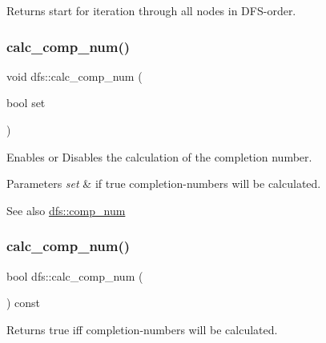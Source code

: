 \begin{DoxyReturn}{Returns}
start for iteration through all nodes in D\+F\+S-\/order. 
\end{DoxyReturn}
\mbox{\label{classdfs_a70862ea715c52eb95fb704afd3a6e676}} 
\subsubsection{\texorpdfstring{calc\+\_\+comp\+\_\+num()}{calc\_comp\_num()}\hspace{0.1cm}{\footnotesize\ttfamily [1/2]}}
{\footnotesize\ttfamily void dfs\+::calc\+\_\+comp\+\_\+num (\begin{DoxyParamCaption}\item[{bool}]{set }\end{DoxyParamCaption})}



Enables or Disables the calculation of the completion number. 


\begin{DoxyParams}{Parameters}
{\em set} & if true completion-\/numbers will be calculated. \\
\hline
\end{DoxyParams}
\begin{DoxySeeAlso}{See also}
\mbox{\hyperlink{classdfs_aceb066c806cb0beb5688b167a17387c7}{dfs\+::comp\+\_\+num}} 
\end{DoxySeeAlso}
\mbox{\label{classdfs_aba80ac24a78448f10b32473633cd2a5d}} 
\subsubsection{\texorpdfstring{calc\+\_\+comp\+\_\+num()}{calc\_comp\_num()}\hspace{0.1cm}{\footnotesize\ttfamily [2/2]}}
{\footnotesize\ttfamily bool dfs\+::calc\+\_\+comp\+\_\+num (\begin{DoxyParamCaption}{ }\end{DoxyParamCaption}) const\hspace{0.3cm}{\ttfamily [inline]}}



Returns true iff completion-\/numbers will be calculated. 


